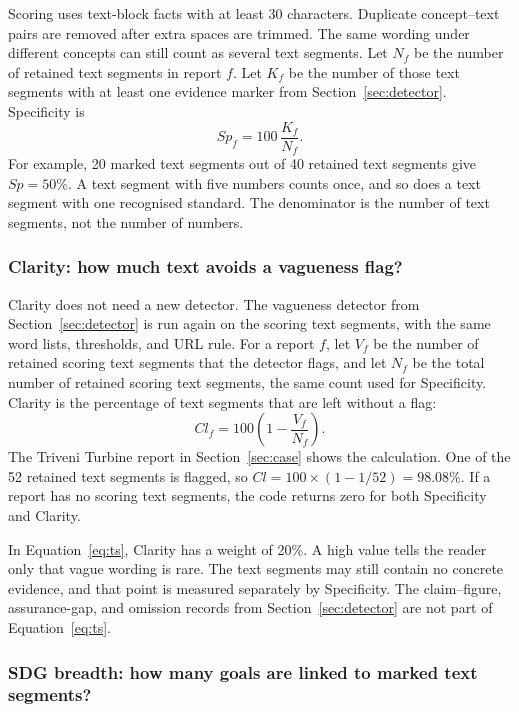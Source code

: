 Scoring uses text-block facts with at least 30 characters. Duplicate concept--text pairs are removed after extra spaces are trimmed. The same wording under different concepts can still count as several text segments. Let $N_f$ be the number of retained text segments in report $f$. Let $K_f$ be the number of those text segments with at least one evidence marker from Section~\ref{sec:detector}. Specificity is
\begin{equation}
Sp_f=100\,\frac{K_f}{N_f}.
\label{eq:specificity}
\end{equation}
For example, 20 marked text segments out of 40 retained text segments give $Sp=50\%$. A text segment with five numbers counts once, and so does a text segment with one recognised standard. The denominator is the number of text segments, not the number of numbers.

\subsubsection{Clarity: how much text avoids a vagueness flag?}

Clarity does not need a new detector. The vagueness detector from Section~\ref{sec:detector} is run again on the scoring text segments, with the same word lists, thresholds, and URL rule. For a report $f$, let $V_f$ be the number of retained scoring text segments that the detector flags, and let $N_f$ be the total number of retained scoring text segments, the same count used for Specificity. Clarity is the percentage of text segments that are left without a flag:
\begin{equation}
Cl_f=100\left(1-\frac{V_f}{N_f}\right).
\label{eq:clarity}
\end{equation}
The Triveni Turbine report in Section~\ref{sec:case} shows the calculation. One of the 52 retained text segments is flagged, so $Cl=100\times(1-1/52)=98.08\%$. If a report has no scoring text segments, the code returns zero for both Specificity and Clarity.

In Equation~\eqref{eq:ts}, Clarity has a weight of 20\%. A high value tells the reader only that vague wording is rare. The text segments may still contain no concrete evidence, and that point is measured separately by Specificity. The claim--figure, assurance-gap, and omission records from Section~\ref{sec:detector} are not part of Equation~\eqref{eq:ts}.

\subsubsection{SDG breadth: how many goals are linked to marked text segments?}

